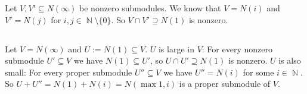 \documentclass[a4paper,10pt]{article}
\theoremstyle{definition}
\newcommand{\N}{\operatorname{\mathbb{N}}}
\begin{document}
Let $V, V' \subseteq N(\infty)$ be nonzero submodules. We know that $V = N(i)$ and $V' = N(j)$ for $i,j \in \N \setminus \{0\}$. So $V \cap V' \supseteq N(1)$ is nonzero.

\subsection{}
Let $V = N(\infty)$ and $U := N(1) \subseteq V$. $U$ is large in $V$: For every nonzero submodule $U' \subseteq V$ we have $N(1) \subseteq U'$, so $U \cap U' \supseteq N(1)$ is nonzero. $U$ is also small: For every proper submodule $U'' \subseteq V$ we have $U'' = N(i)$ for some $i \in \N$. So $U + U'' = N(1) + N(i) = N(\max{1,i})$ is a proper submodule of $V$.
\end{document}
